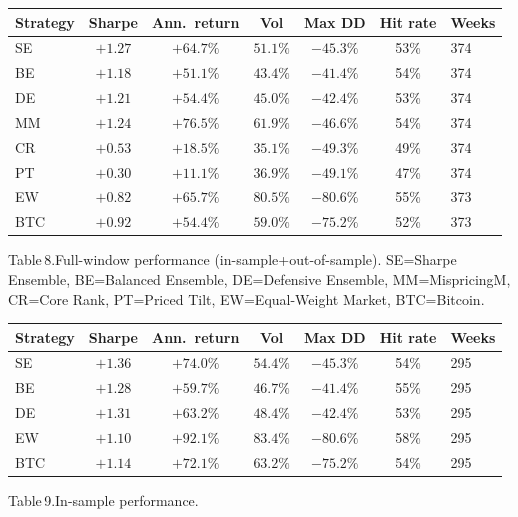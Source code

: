 \documentclass[11pt,a4paper]{article}
\begin{document}
\begin{center}
\small
\begin{tabular}{lcccccl}
\toprule
\rowcolor{tablehead}
\textbf{Strategy} & \textbf{Sharpe} & \textbf{Ann.\ return} & \textbf{Vol} & \textbf{Max DD} & \textbf{Hit rate} & \textbf{Weeks} \\
\midrule
SE  & $+1.27$ & $+64.7\%$ & $51.1\%$ & $-45.3\%$ & 53\% & 374 \\
BE  & $+1.18$ & $+51.1\%$ & $43.4\%$ & $-41.4\%$ & 54\% & 374 \\
DE  & $+1.21$ & $+54.4\%$ & $45.0\%$ & $-42.4\%$ & 53\% & 374 \\
MM  & $+1.24$ & $+76.5\%$ & $61.9\%$ & $-46.6\%$ & 54\% & 374 \\
CR  & $+0.53$ & $+18.5\%$ & $35.1\%$ & $-49.3\%$ & 49\% & 374 \\
PT  & $+0.30$ & $+11.1\%$ & $36.9\%$ & $-49.1\%$ & 47\% & 374 \\
EW  & $+0.82$ & $+65.7\%$ & $80.5\%$ & $-80.6\%$ & 55\% & 373 \\
BTC & $+0.92$ & $+54.4\%$ & $59.0\%$ & $-75.2\%$ & 52\% & 373 \\
\bottomrule
\end{tabular}
\end{center}
\smallskip
{\small Table\,8.\;Full-window performance (in-sample\;+\;out-of-sample). SE\;=\;Sharpe Ensemble, BE\;=\;Balanced Ensemble, DE\;=\;Defensive Ensemble, MM\;=\;MispricingM, CR\;=\;Core Rank, PT\;=\;Priced Tilt, EW\;=\;Equal-Weight Market, BTC\;=\;Bitcoin.}

\begin{center}
\small
\begin{tabular}{lcccccl}
\toprule
\rowcolor{tablehead}
\textbf{Strategy} & \textbf{Sharpe} & \textbf{Ann.\ return} & \textbf{Vol} & \textbf{Max DD} & \textbf{Hit rate} & \textbf{Weeks} \\
\midrule
SE  & $+1.36$ & $+74.0\%$ & $54.4\%$ & $-45.3\%$ & 54\% & 295 \\
BE  & $+1.28$ & $+59.7\%$ & $46.7\%$ & $-41.4\%$ & 55\% & 295 \\
DE  & $+1.31$ & $+63.2\%$ & $48.4\%$ & $-42.4\%$ & 53\% & 295 \\
EW  & $+1.10$ & $+92.1\%$ & $83.4\%$ & $-80.6\%$ & 58\% & 295 \\
BTC & $+1.14$ & $+72.1\%$ & $63.2\%$ & $-75.2\%$ & 54\% & 295 \\
\bottomrule
\end{tabular}
\end{center}
\smallskip
{\small Table\,9.\;In-sample performance.}
\end{document}
